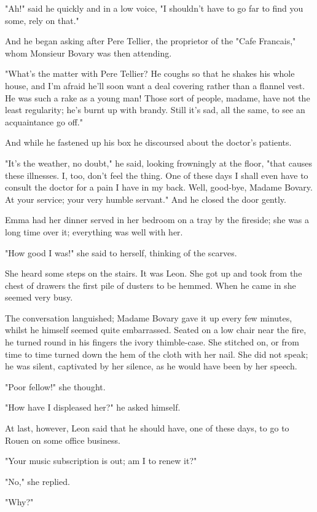 \documentclass[11pt,twocolumn]{ltugboat}
\begin{document}
"Ah!" said he quickly and in a low voice, "I shouldn't have to go far to
find you some, rely on that."

And he began asking after Pere Tellier, the proprietor of the "Cafe
Francais," whom Monsieur Bovary was then attending.

"What's the matter with Pere Tellier? He coughs so that he shakes his
whole house, and I'm afraid he'll soon want a deal covering rather than
a flannel vest. He was such a rake as a young man! Those sort of people,
madame, have not the least regularity; he's burnt up with brandy. Still
it's sad, all the same, to see an acquaintance go off."

And while he fastened up his box he discoursed about the doctor's
patients.

"It's the weather, no doubt," he said, looking frowningly at the floor,
"that causes these illnesses. I, too, don't feel the thing. One of these
days I shall even have to consult the doctor for a pain I have in my
back. Well, good-bye, Madame Bovary. At your service; your very humble
servant." And he closed the door gently.

Emma had her dinner served in her bedroom on a tray by the fireside; she
was a long time over it; everything was well with her.

"How good I was!" she said to herself, thinking of the scarves.

She heard some steps on the stairs. It was Leon. She got up and took
from the chest of drawers the first pile of dusters to be hemmed. When
he came in she seemed very busy.

The conversation languished; Madame Bovary gave it up every few minutes,
whilst he himself seemed quite embarrassed. Seated on a low chair near
the fire, he turned round in his fingers the ivory thimble-case. She
stitched on, or from time to time turned down the hem of the cloth with
her nail. She did not speak; he was silent, captivated by her silence,
as he would have been by her speech.

"Poor fellow!" she thought.

"How have I displeased her?" he asked himself.

At last, however, Leon said that he should have, one of these days, to
go to Rouen on some office business.

"Your music subscription is out; am I to renew it?"

"No," she replied.

"Why?"
\end{document}
